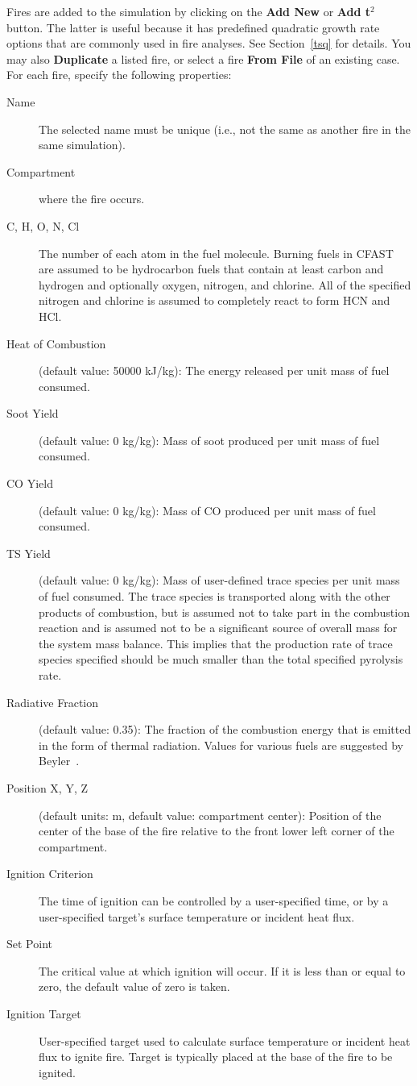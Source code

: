 Fires are added to the simulation by clicking on the {\bf Add New} or {\bf Add t$^2$} button. The latter is useful because it has predefined quadratic growth rate options that are commonly used in fire analyses. See Section~\ref{tsq} for details. You may also {\bf Duplicate} a listed fire, or select a fire {\bf From File} of an existing case. For each fire, specify the following properties:
\begin{description}
\item[Name] The selected name must be unique (i.e., not the same as another fire in the same simulation).
\item[Compartment] where the fire occurs.
\item[C, H, O, N, Cl] The number of each atom in the fuel molecule. Burning fuels in CFAST are assumed to be hydrocarbon fuels that contain at least carbon and hydrogen and optionally oxygen, nitrogen, and chlorine. All of the specified nitrogen and chlorine is assumed to completely react to form HCN and HCl.
\item[Heat of Combustion] (default value: 50000 kJ/kg): The energy released per unit mass of fuel consumed.
\item[Soot Yield] (default value: 0 kg/kg): Mass of soot produced per unit mass of fuel consumed.
\item[CO Yield] (default value: 0 kg/kg): Mass of CO produced per unit mass of fuel consumed.
\item[TS Yield] (default value: 0 kg/kg): Mass of user-defined trace species per unit mass of fuel consumed. The trace species is transported along with the other products of combustion, but is assumed not to take part in the combustion reaction and is assumed not to be a significant source of overall mass for the system mass balance. This implies that the production rate of trace species specified should be much smaller than the total specified pyrolysis rate.
\item[Radiative Fraction] (default value: 0.35): The fraction of the combustion energy that is emitted in the form of thermal radiation. Values for various fuels are suggested by Beyler~\cite{Beyler2:SFPE}.
\item[Position X, Y, Z] (default units: m, default value: compartment center): Position of the center of the base of the fire relative to the front lower left corner of the compartment.
\item[Ignition Criterion] The time of ignition can be controlled by a user-specified time, or by a user-specified target's surface temperature or incident heat flux.
\item[Set Point] The critical value at which ignition will occur. If it is less than or equal to zero, the default value of zero is taken.
\item[Ignition Target] User-specified target used to calculate surface temperature or incident heat flux to ignite fire. Target is typically placed at the base of the fire to be ignited.
\end{description}

